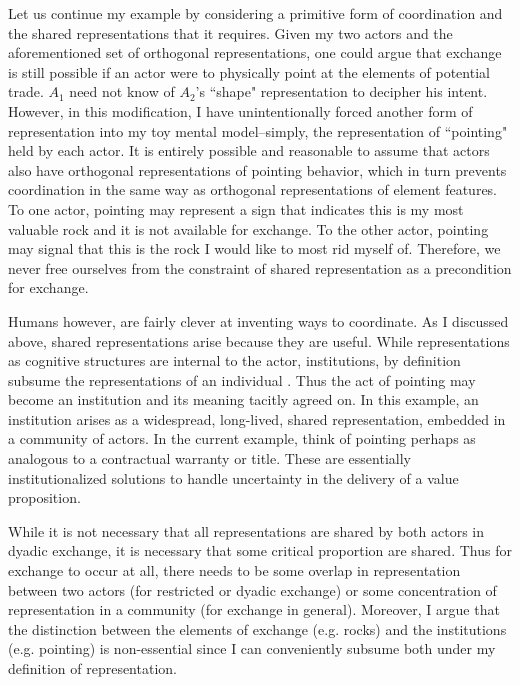 Let us continue my example by considering a primitive form of coordination and the shared representations that it requires. Given my two actors and the aforementioned set of orthogonal representations, one could argue that exchange is still possible if an actor were to physically point at the elements of potential trade. $A_1$ need not know of $A_2$'s ``shape" representation to decipher his intent. However, in this modification, I have unintentionally forced another form of representation into my toy mental model--simply, the representation of ``pointing" held by each actor. It is entirely possible and reasonable to assume that actors also have orthogonal representations of pointing behavior, which in turn prevents coordination in the same way as orthogonal representations of element features. To one actor, pointing may represent a sign that indicates this is my most valuable rock and it is not available for exchange. To the other actor, pointing may signal that this is the rock I would like to most rid myself of. Therefore, we never free ourselves from the constraint of shared representation as a precondition for exchange. 

Humans however, are fairly clever at inventing ways to coordinate. As I discussed above, shared representations arise because they are useful. While representations as cognitive structures are internal to the actor, institutions, by definition subsume the representations of an individual \citep{denzau1994}. Thus the act of pointing may become an institution and its meaning tacitly agreed on. In this example, an institution arises as a widespread, long-lived, shared representation, embedded in a community of actors. In the current example, think of pointing perhaps as analogous to a contractual warranty or title. These are essentially institutionalized solutions to handle uncertainty in the delivery of a value proposition. 

While it is not necessary that all representations are shared by both actors in dyadic exchange, it is necessary that some critical proportion are shared. Thus for exchange to occur at all, there needs to be some overlap in representation between two actors (for restricted or dyadic exchange) or some concentration of representation in a community (for exchange in general). Moreover, I argue that the distinction between the elements of exchange (e.g. rocks) and the institutions (e.g. pointing) is non-essential since I can conveniently subsume both under my definition of representation. 

